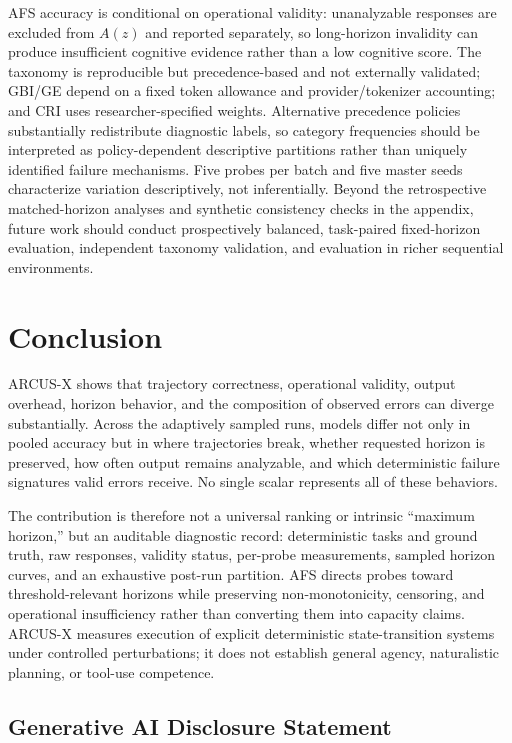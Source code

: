 \documentclass{article}
\begin{document}
AFS accuracy is conditional on operational validity: unanalyzable responses are excluded from $A(z)$ and reported separately, so long-horizon invalidity can produce insufficient cognitive evidence rather than a low cognitive score. The taxonomy is reproducible but precedence-based and not externally validated; GBI/GE depend on a fixed token allowance and provider/tokenizer accounting; and CRI uses researcher-specified weights. Alternative precedence policies substantially redistribute diagnostic labels, so category frequencies should be interpreted as policy-dependent descriptive partitions rather than uniquely identified failure mechanisms. Five probes per batch and five master seeds characterize variation descriptively, not inferentially. Beyond the retrospective matched-horizon analyses and synthetic consistency checks in the appendix, future work should conduct prospectively balanced, task-paired fixed-horizon evaluation, independent taxonomy validation, and evaluation in richer sequential environments.
\section{Conclusion}


ARCUS-X shows that trajectory correctness, operational validity, output overhead, horizon behavior, and the composition of observed errors can diverge substantially. Across the adaptively sampled runs, models differ not only in pooled accuracy but in where trajectories break, whether requested horizon is preserved, how often output remains analyzable, and which deterministic failure signatures valid errors receive. No single scalar represents all of these behaviors.

The contribution is therefore not a universal ranking or intrinsic ``maximum horizon,'' but an auditable diagnostic record: deterministic tasks and ground truth, raw responses, validity status, per-probe measurements, sampled horizon curves, and an exhaustive post-run partition. AFS directs probes toward threshold-relevant horizons while preserving non-monotonicity, censoring, and operational insufficiency rather than converting them into capacity claims. ARCUS-X measures execution of explicit deterministic state-transition systems under controlled perturbations; it does not establish general agency, naturalistic planning, or tool-use competence.


\subsection*{Generative AI Disclosure Statement}
\end{document}
